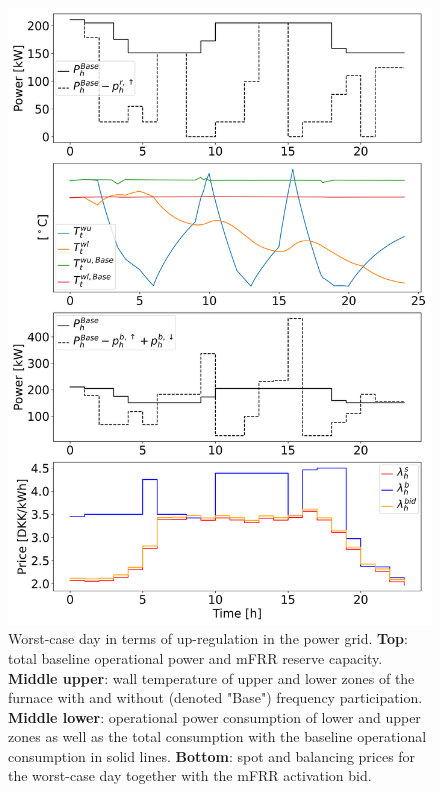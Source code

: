 \documentclass[sigconf]{acmart}
\begin{document}
\begin{figure}[t]
    \centering
    \includegraphics[width=\columnwidth]{figures/mfrr_single_case.png}
    \caption{Worst-case day in terms of up-regulation in the power grid. \textbf{Top}: total baseline operational power and mFRR reserve capacity. \textbf{Middle upper}: wall temperature of upper and lower zones of the furnace with and without (denoted "Base") frequency participation. \textbf{Middle lower}: operational power consumption of lower and upper zones as well as the total consumption with the baseline operational consumption in solid lines. \textbf{Bottom}: spot and balancing prices for the worst-case day together with the mFRR activation bid.}
    \label{fig:mfrr_single_case}
\end{figure}
\end{document}
